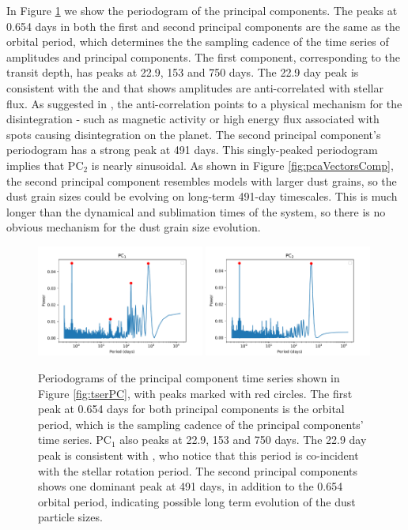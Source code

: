 \documentclass[preprint]{aastex61}
\begin{document}
In Figure \ref{fig:ampPeriodogram} we show the periodogram of the principal components.
The peaks at 0.654 days in both the first and second principal components are the same as the orbital period, which determines the the sampling cadence of the time series of amplitudes and principal components.
The first component, corresponding to the transit depth, has peaks at 22.9, 153 and 750 days.
The 22.9 day peak is consistent with the \citet{kawahara2013starspots} and \citet{croll2015starspots} that shows amplitudes are anti-correlated with stellar flux.
As suggested in \citet{kawahara2013starspots}, the anti-correlation points to a physical mechanism for the disintegration - such as magnetic activity or high energy flux associated with spots causing disintegration on the planet.
The second principal component's periodogram has a strong peak at 491 days.
This singly-peaked periodogram implies that PC$_2$ is nearly sinusoidal.
As shown in Figure \ref{fig:pcaVectorsComp}, the second principal component resembles models with larger dust grains, so the dust grain sizes could be evolving on long-term 491-day timescales.
This is much longer than the dynamical and sublimation times of the system, so there is no obvious mechanism for the dust grain size evolution.

\begin{figure}[!hbtp]
\begin{centering}
\includegraphics[width=0.49\textwidth]{images/kepler/pc1_periodogram.pdf}
\includegraphics[width=0.49\textwidth]{images/kepler/pc2_periodogram.pdf}
\caption{Periodograms of the principal component time series shown in Figure \ref{fig:tserPC}, with peaks marked with red circles.
The first peak at 0.654 days for both principal components is the orbital period, which is the sampling cadence of the principal components' time series.
PC$_1$ also peaks at 22.9, 153 and 750 days.
The 22.9 day peak is consistent with \citet{kawahara2013starspots}, who notice that this period is co-incident with the stellar rotation period.
The second principal components shows one dominant peak at 491 days, in addition to the 0.654 orbital period, indicating possible long term evolution of the dust particle sizes.}\label{fig:ampPeriodogram}
\end{centering}
\end{figure}
\end{document}
